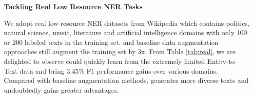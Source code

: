 \begin{table}[bt!]
\centering
{}
\vspace{-2mm}
\caption{F1 results of real low resource NER tasks.}
\label{tab:real}
\vspace{-2mm}
\end{table}
\noindent\textbf{Tackling Real Low Resource NER Tasks}

We adopt real low resource NER datasets \cite{liu2021crossner} from Wikipedia which contains politics, natural science, music, literature and artificial intelligence domains with only 100 or 200 labeled texts in the training set. {\modelname} and baseline data augmentation approaches still augment the training set by 3x. 
From Table \ref{tab:real}, we are delighted to observe {\modelname} could quickly learn from the extremely limited Entity-to-Text data and bring 3.45\% F1 performance gains over various domains. Compared with baseline augmentation methods, {\modelname} generates more diverse texts and undoubtedly gains greater advantages.

